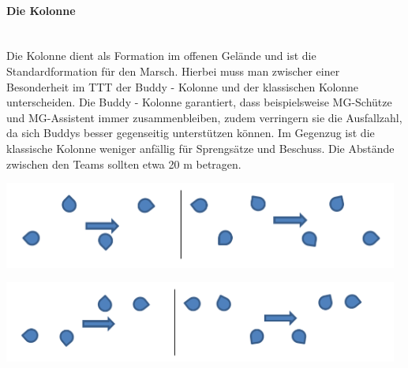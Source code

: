 \paragraph{Die Kolonne}$\ $\\
Die Kolonne dient als Formation im offenen Gelände und ist die Standardformation für den Marsch. Hierbei muss man zwischer einer Besonderheit im TTT der Buddy - Kolonne und der klassischen Kolonne unterscheiden. Die Buddy - Kolonne garantiert, dass beispielsweise MG-Schütze und MG-Assistent immer zusammenbleiben, zudem verringern sie die Ausfallzahl, da sich Buddys besser gegenseitig unterstützen können. Im Gegenzug ist die klassische Kolonne weniger anfällig für Sprengsätze und Beschuss. Die Abstände zwischen den Teams sollten etwa 20 m betragen.\\
\begin{minipage}[t]{1\textwidth}
	\includegraphics[width=13cm]{./Grafiken/Abschnitt/Kolonne.png}
	\label{Kolonne}
\end{minipage}
\begin{minipage}[t]{1\textwidth}
	\includegraphics[width=13cm]{./Grafiken/Abschnitt/Buddykolonne.png}
\end{minipage}
